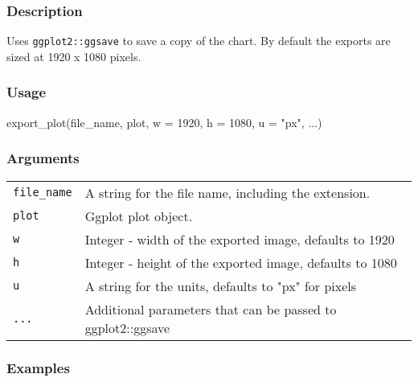 \documentclass[
  letterpaper,
  DIV=11,
  numbers=noendperiod]{scrreport}
\newenvironment{Shaded}{\begin{snugshade}}{\end{snugshade}}
\newcommand{\AttributeTok}[1]{\textcolor[rgb]{0.40,0.45,0.13}{#1}}
\newcommand{\DecValTok}[1]{\textcolor[rgb]{0.68,0.00,0.00}{#1}}
\newcommand{\FunctionTok}[1]{\textcolor[rgb]{0.28,0.35,0.67}{#1}}
\newcommand{\NormalTok}[1]{\textcolor[rgb]{0.00,0.23,0.31}{#1}}
\newcommand{\StringTok}[1]{\textcolor[rgb]{0.13,0.47,0.30}{#1}}
\begin{document}
\subsubsection{Description}\label{description-81}

Uses \texttt{ggplot2::ggsave} to save a copy of the chart. By default
the exports are sized at 1920 x 1080 pixels.

\subsubsection{Usage}\label{usage-81}

\begin{Shaded}
\begin{Highlighting}[]
\FunctionTok{export\_plot}\NormalTok{(file\_name, plot, }\AttributeTok{w =} \DecValTok{1920}\NormalTok{, }\AttributeTok{h =} \DecValTok{1080}\NormalTok{, }\AttributeTok{u =} \StringTok{"px"}\NormalTok{, ...)}
\end{Highlighting}
\end{Shaded}

\subsubsection{Arguments}\label{arguments-81}

\begin{longtable}[]{@{}ll@{}}
\toprule\noalign{}
\endhead
\bottomrule\noalign{}
\endlastfoot
\texttt{file\_name} & A string for the file name, including the
extension. \\
\texttt{plot} & Ggplot plot object. \\
\texttt{w} & Integer - width of the exported image, defaults to 1920 \\
\texttt{h} & Integer - height of the exported image, defaults to 1080 \\
\texttt{u} & A string for the units, defaults to "px" for pixels \\
\texttt{...} & Additional parameters that can be passed to
ggplot2::ggsave \\
\end{longtable}

\subsubsection{Examples}\label{examples-80}
\end{document}
